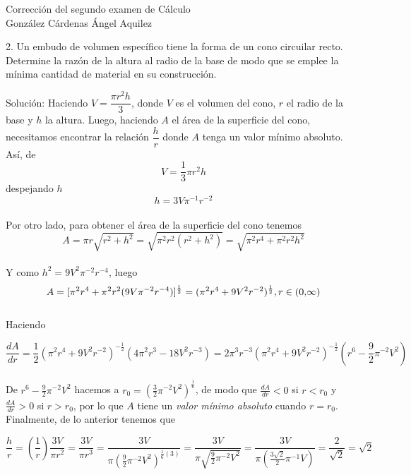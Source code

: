 \documentclass[a4paper,12pt]{report}
\begin{document}
\begin{center}
\Huge{Corrección del segundo examen de Cálculo}\\
\vspace{0.5cm}
\Large{González Cárdenas Ángel Aquilez} \\
\end{center}

\vspace{0.5cm}

2. Un embudo de volumen específico tiene la forma de un cono circuilar recto. Determine la razón de la altura al radio de la base de modo que se emplee la mínima cantidad de material en su construcción. \\ \vspace{0.5cm}

Solución: Haciendo $V = \dfrac{\pi r^2 h}{3}$, donde $V$ es el volumen del cono, $r$ el radio de la base y $h$ la altura. Luego, haciendo $A$ el área de la superficie del cono, necesitamos encontrar la relación $\dfrac{h}{r}$ donde $A$ tenga un valor mínimo absoluto.\\

Así, de 
\[V = \frac{1}{3} \pi r^2 h\] despejando $h$
\[h = 3V \pi^{-1} r^{-2}\] \\
Por otro lado, para obtener el área de la superficie del cono tenemos
\[ A = \pi r \sqrt{r^2 + h^2} = \sqrt{\pi^2 r^2(r^2 + h^2)} = \sqrt{\pi^2 r^4 + \pi^2 r^2 h^2}\] \\
Y como $h^2 = 9V^2 \pi^{-2} r^{-4}$, luego
\[A = [ \pi^2 r^4 + \pi^2 r^2 (9V \pi^{-2} r^{-4})]^\frac{1}{2} = (\pi^2 r^4 + 9V^2 r^{-2})^\frac{1}{2}, r \in \interval({0,\infty}) \] \\

Haciendo

\[\frac{d A}{d r} = \frac{1}{2} (\pi^2 r^4 + 9V^2 r^{-2})^{-\frac{1}{2}} (4\pi^2 r^3 - 18V^2 r^{-3}) = 2\pi^3 r^{-3}(\pi^2 r^4 + 9V^2 r^{-2})^{-\frac{1}{2}} (r^6 - \frac{9}{2} \pi^{-2} V^2)\] \\

De $r^6 - \frac{9}{2} \pi^{-2} V^2$ hacemos a $r_0 = (\frac{3}{2} \pi^{-2} V^2)^{\frac{1}{6}}$, de modo que $\frac{d A}{d r} < 0$ si $r < r_0$ y $\frac{d A}{d r} > 0$ si $r > r_0$, por lo que $A$ tiene un \emph{valor mínimo absoluto} cuando $r = r_0$. \\

Finalmente, de lo anterior tenemos que

\[ \frac{h}{r} = (\frac{1}{r}) \frac{3V}{\pi r^2} = \frac{3V}{\pi r^3} = \frac{3V}{\pi (\frac{9}{2} \pi^{-2} V^2)^{\frac{1}{6} (3)}} = \frac{3V}{\pi \sqrt{\frac{9}{2} \pi^{-2} V^2}} = \frac{3V}{\pi(\frac{3 \sqrt{2}}{2} \pi^{-1} V )} = \frac{2}{\sqrt{2}} = \sqrt{2}\] 
\end{document}
